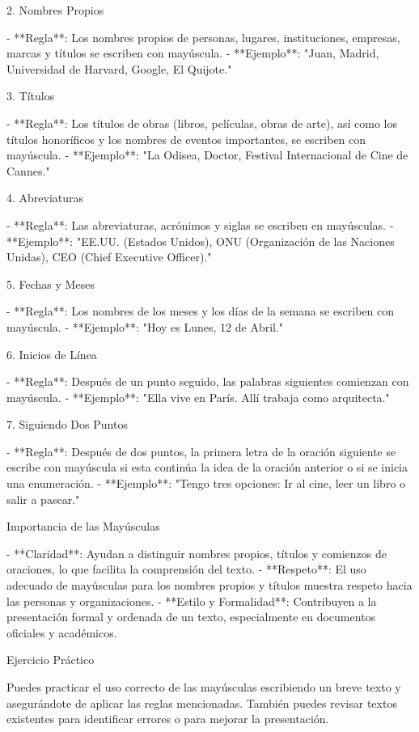 2. Nombres Propios

- **Regla**: Los nombres propios de personas, lugares, instituciones, empresas, marcas y títulos se escriben con mayúscula.
- **Ejemplo**: "Juan, Madrid, Universidad de Harvard, Google, El Quijote."

3. Títulos

- **Regla**: Los títulos de obras (libros, películas, obras de arte), así como los títulos honoríficos y los nombres de eventos importantes, se escriben con mayúscula.
- **Ejemplo**: "La Odisea, Doctor, Festival Internacional de Cine de Cannes."

4. Abreviaturas

- **Regla**: Las abreviaturas, acrónimos y siglas se escriben en mayúsculas.
- **Ejemplo**: "EE.UU. (Estados Unidos), ONU (Organización de las Naciones Unidas), CEO (Chief Executive Officer)."

5. Fechas y Meses

- **Regla**: Los nombres de los meses y los días de la semana se escriben con mayúscula.
- **Ejemplo**: "Hoy es Lunes, 12 de Abril."

6. Inicios de Línea

- **Regla**: Después de un punto seguido, las palabras siguientes comienzan con mayúscula.
- **Ejemplo**: "Ella vive en París. Allí trabaja como arquitecta."

7. Siguiendo Dos Puntos

- **Regla**: Después de dos puntos, la primera letra de la oración siguiente se escribe con mayúscula si esta continúa la idea de la oración anterior o si se inicia una enumeración.
- **Ejemplo**: "Tengo tres opciones: Ir al cine, leer un libro o salir a pasear."

Importancia de las Mayúsculas

- **Claridad**: Ayudan a distinguir nombres propios, títulos y comienzos de oraciones, lo que facilita la comprensión del texto.
- **Respeto**: El uso adecuado de mayúsculas para los nombres propios y títulos muestra respeto hacia las personas y organizaciones.
- **Estilo y Formalidad**: Contribuyen a la presentación formal y ordenada de un texto, especialmente en documentos oficiales y académicos.

Ejercicio Práctico

Puedes practicar el uso correcto de las mayúsculas escribiendo un breve texto y asegurándote de aplicar las reglas mencionadas. También puedes revisar textos existentes para identificar errores o para mejorar la presentación.

